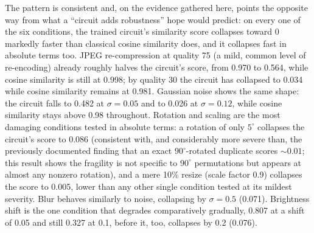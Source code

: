 \documentclass[conference]{IEEEtran}
\begin{document}
The pattern is consistent and, on the evidence gathered here, points the opposite way from what a ``circuit adds robustness'' hope would predict: on every one of the six conditions, the trained circuit's similarity score collapses toward 0 markedly faster than classical cosine similarity does, and it collapses fast in absolute terms too. JPEG re-compression at quality 75 (a mild, common level of re-encoding) already roughly halves the circuit's score, from 0.970 to 0.564, while cosine similarity is still at 0.998; by quality 30 the circuit has collapsed to 0.034 while cosine similarity remains at 0.981. Gaussian noise shows the same shape: the circuit falls to 0.482 at $\sigma = 0.05$ and to 0.026 at $\sigma = 0.12$, while cosine similarity stays above 0.98 throughout. Rotation and scaling are the most damaging conditions tested in absolute terms: a rotation of only $5^\circ$ collapses the circuit's score to 0.086 (consistent with, and considerably more severe than, the previously documented finding that an exact $90^\circ$-rotated duplicate scores $\sim\!0.01$; this result shows the fragility is not specific to $90^\circ$ permutations but appears at almost any nonzero rotation), and a mere 10\% resize (scale factor 0.9) collapses the score to 0.005, lower than any other single condition tested at its mildest severity. Blur behaves similarly to noise, collapsing by $\sigma = 0.5$ (0.071). Brightness shift is the one condition that degrades comparatively gradually, 0.807 at a shift of 0.05 and still 0.327 at 0.1, before it, too, collapses by 0.2 (0.076).
\end{document}

